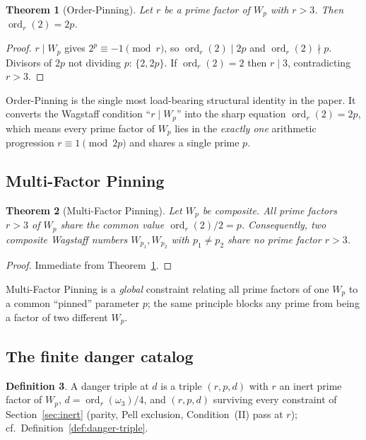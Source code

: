 \documentclass[11pt]{amsart}
\theoremstyle{plain}
\newtheorem{theorem}{Theorem}[section]
\theoremstyle{definition}
\newtheorem{definition}[theorem]{Definition}
\theoremstyle{remark}
\numberwithin{equation}{section}
\newcommand{\ord}{\operatorname{ord}}
\begin{document}
\begin{theorem}[Order-Pinning]\label{thm:order-pinning}
Let $r$ be a prime factor of $W_p$ with $r > 3$. Then $\ord_r(2) = 2 p$.
\end{theorem}

\begin{proof}
$r \mid W_p$ gives $2^p \equiv -1 \pmod r$, so $\ord_r(2) \mid 2 p$ and $\ord_r(2) \nmid p$. Divisors of $2 p$ not dividing $p$: $\{2, 2 p\}$. If $\ord_r(2) = 2$ then $r \mid 3$, contradicting $r > 3$.
\end{proof}

Order-Pinning is the single most load-bearing structural identity in the paper. It converts the Wagstaff condition ``$r \mid W_p$'' into the sharp equation $\ord_r(2) = 2 p$, which means every prime factor of $W_p$ lies in the \emph{exactly one} arithmetic progression $r \equiv 1 \pmod{2 p}$ and shares a single prime $p$.

\subsection{Multi-Factor Pinning}

\begin{theorem}[Multi-Factor Pinning]\label{thm:multi-pinning}
Let $W_p$ be composite. All prime factors $r > 3$ of $W_p$ share the common value $\ord_r(2)/2 = p$. Consequently, two composite Wagstaff numbers $W_{p_1}, W_{p_2}$ with $p_1 \neq p_2$ share no prime factor $r > 3$.
\end{theorem}

\begin{proof}
Immediate from Theorem~\ref{thm:order-pinning}.
\end{proof}

Multi-Factor Pinning is a \emph{global} constraint relating all prime factors of one $W_p$ to a common ``pinned'' parameter $p$; the same principle blocks any prime from being a factor of two different $W_p$.

\subsection{The finite danger catalog}

\begin{definition}\label{def:danger-at-d}
A danger triple at $d$ is a triple $(r, p, d)$ with $r$ an inert prime factor of $W_p$, $d = \ord_r(\omega_3)/4$, and $(r, p, d)$ surviving every constraint of Section~\ref{sec:inert} (parity, Pell exclusion, Condition~(II) pass at $r$); cf.\ Definition~\ref{def:danger-triple}.
\end{definition}
\end{document}
